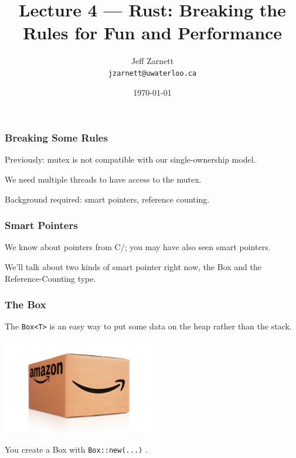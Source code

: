 


\title{Lecture 4 --- Rust: Breaking the Rules for Fun and Performance  }

\author{Jeff Zarnett \\ \small \texttt{jzarnett@uwaterloo.ca}}
\date{\today}




\begin{frame}
  \titlepage

 \end{frame}
 

\begin{frame}
\frametitle{Breaking Some Rules}

Previously: mutex is not compatible with our single-ownership model.

We need multiple threads to have access to the mutex.

Background required: smart pointers, reference counting.

\end{frame}


\begin{frame}
\frametitle{Smart Pointers}
We know about pointers from C/\CPP; you may have also seen smart pointers.

We'll talk about two kinds of smart pointer right now, the Box and the Reference-Counting type.

\end{frame}


\begin{frame}
\frametitle{The Box}

The \texttt{Box<T>} is an easy way to put some data on the heap rather than the stack.

\begin{center}
	\includegraphics[width=0.5\textwidth]{images/amazonbox.jpg}
\end{center}

You create a Box with \texttt{Box::new(...)} .
\end{frame}


